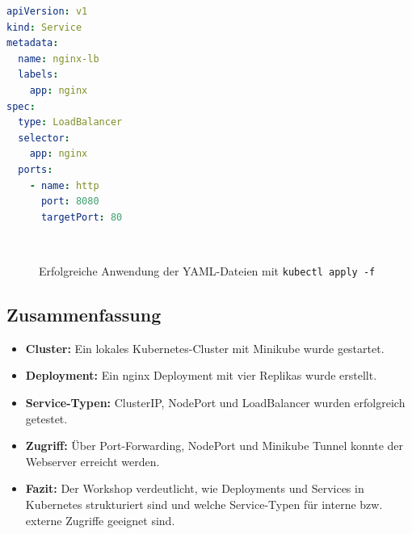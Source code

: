\documentclass[11pt,a4paper,twocolumn]{article}
\newcommand{\placeholderfig}[2]{%
  \begin{figure}[H]\centering
    \fbox{\rule{0pt}{0.3\linewidth}\rule{0.9\linewidth}{0pt}}\\[2mm]
    \caption{#1}\label{fig:#2}
  \end{figure}}
\begin{document}
\begin{lstlisting}[language=yaml,caption={Service YAML – LoadBalancer}]
apiVersion: v1
kind: Service
metadata:
  name: nginx-lb
  labels:
    app: nginx
spec:
  type: LoadBalancer
  selector:
    app: nginx
  ports:
    - name: http
      port: 8080
      targetPort: 80
\end{lstlisting}

\placeholderfig{Erfolgreiche Anwendung der YAML-Dateien mit \texttt{kubectl apply -f}}{yaml-apply}

\subsection{Zusammenfassung}

\begin{itemize}[leftmargin=*]
  \item \textbf{Cluster:} Ein lokales Kubernetes-Cluster mit Minikube wurde gestartet.
  \item \textbf{Deployment:} Ein nginx Deployment mit vier Replikas wurde erstellt.
  \item \textbf{Service-Typen:} ClusterIP, NodePort und LoadBalancer wurden erfolgreich getestet.
  \item \textbf{Zugriff:} Über Port-Forwarding, NodePort und Minikube Tunnel konnte der Webserver erreicht werden.
  \item \textbf{Fazit:} Der Workshop verdeutlicht, wie Deployments und Services in Kubernetes strukturiert sind und welche Service-Typen für interne bzw. externe Zugriffe geeignet sind.
\end{itemize}
\usepackage{lmodern}
\usepackage{graphicx}
\usepackage{float}
\usepackage{hyperref}
\usepackage{xcolor}
\usepackage{enumitem}
\usepackage{booktabs}
\usepackage{array}
\usepackage{titlesec}
\usepackage{listings}
\usepackage{caption}
\usepackage{tcolorbox}
\usepackage{longtable}
\usepackage{multicol}
\usepackage{eso-pic}   
\usepackage{xcolor}
\usepackage{tabularx}


\end{document}
